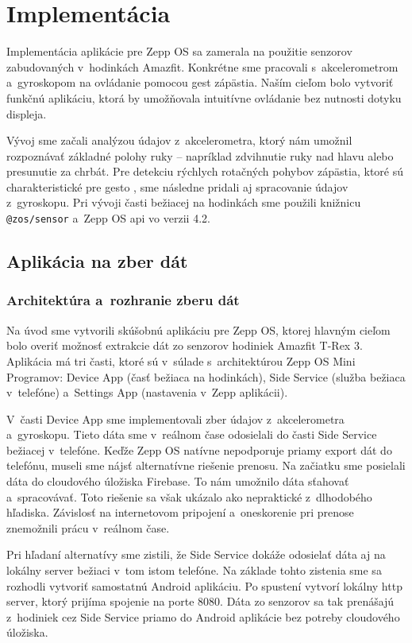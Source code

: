 \section{Implementácia}
\label{chapter:implementacia}

Implementácia aplikácie pre Zepp OS sa zamerala na
použitie senzorov zabudovaných v~hodinkách Amazfit.
Konkrétne sme pracovali s~akcelerometrom a~gyroskopom
na ovládanie pomocou gest zápästia. Naším cieľom bolo
vytvoriť funkčnú aplikáciu, ktorá by umožňovala
intuitívne ovládanie bez nutnosti dotyku displeja.

Vývoj sme začali analýzou údajov z~akcelerometra,
ktorý nám umožnil rozpoznávať základné polohy ruky --
napríklad zdvihnutie ruky nad hlavu alebo presunutie
za chrbát. Pre detekciu rýchlych rotačných pohybov
zápästia, ktoré sú charakteristické pre gesto ,
sme následne pridali aj spracovanie údajov
z~gyroskopu. Pri vývoji časti bežiacej na hodinkách
sme použili knižnicu \texttt{@zos/sensor} a~Zepp OS
\Gls{api} vo verzii 4.2.

\subsection{Aplikácia na zber dát}
\label{sec:zber-app}

\subsubsection{Architektúra a~rozhranie zberu dát}
Na úvod sme vytvorili skúšobnú aplikáciu pre Zepp OS,
ktorej hlavným cieľom bolo overiť možnosť extrakcie
dát zo senzorov hodiniek Amazfit T-Rex 3. Aplikácia
má tri časti, ktoré sú v~súlade s~architektúrou
Zepp OS Mini Programov: Device App (časť bežiaca na
hodinkách), Side Service (služba bežiaca v~telefóne)
a~Settings App (nastavenia v~Zepp aplikácii).

V~časti Device App sme implementovali zber údajov
z~akcelerometra a~gyroskopu. Tieto dáta sme
v~reálnom čase odosielali do časti Side Service bežiacej
v~telefóne. Keďže Zepp OS natívne nepodporuje priamy
export dát do telefónu, museli sme nájsť alternatívne
riešenie prenosu. Na začiatku sme posielali dáta do
cloudového úložiska Firebase. To nám umožnilo dáta
sťahovať a~spracovávať. Toto riešenie sa však ukázalo
ako nepraktické z~dlhodobého hľadiska. Závislosť na
internetovom pripojení a~oneskorenie pri prenose
znemožnili prácu v~reálnom čase.

Pri hľadaní alternatívy sme zistili, že Side Service
dokáže odosielať dáta aj na lokálny server bežiaci
v~tom istom telefóne. Na základe tohto zistenia sme
sa rozhodli vytvoriť samostatnú Android aplikáciu.
Po spustení vytvorí lokálny \Gls{http} server, ktorý
prijíma spojenie na porte 8080. Dáta zo senzorov sa tak
prenášajú z~hodiniek cez Side Service priamo do Android
aplikácie bez potreby cloudového úložiska.

